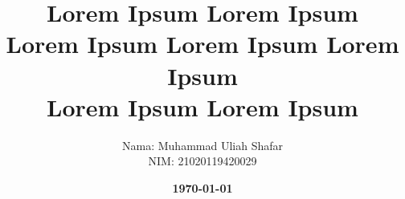 \documentclass[12pt, landscape]{simrep} %
\title{
	\textbf{Lorem Ipsum Lorem Ipsum \\
		Lorem Ipsum Lorem Ipsum Lorem Ipsum} \\
	\textbf{{Lorem Ipsum Lorem Ipsum \\}}
} %
\date{\textbf{\today}}
\author{
	\begin{tabular}{@{}ll@{}}
		Nama  &  : Muhammad Uliah Shafar  \\
		NIM   &  : 21020119420029  \\
	\end{tabular}
}
\begin{document}
\begin{comment}

\setlength\LTleft{0pt}
\setlength\LTright{0pt}
\begin{longtable}{*{8}{P{1.15in}}@{}}
	\toprule
	\logo                  & \multicolumn{5}{c}{ \large\thead{UNIVERSITAS MUHAMMADIYAH PAREPARE                                                                                                                                    \\  FAKULTAS TEKNIK\\ JURUSAN PERANCANGAN WILAYAH KOTA}} & \multicolumn{2}{c}{\kode} \\
    \bottomrule
	\multicolumn{8}{c}{\bfseries rencana pembelajaran semester}                                                                                                                                                                                            \\
    \midrule
    \multicolumn{2}{l}{\bfseries mata kuliah (MK)}       & \textbf{kode}                                                         & \textbf{rumpun mata kuliah}                 & \textbf{bobot (sks)}                             & \textbf{semester} & \multicolumn{2}{l}{\bfseries tanggal penyusunan} \\
    \midrule
	\multicolumn{2}{l}{\mk}                    & \kodemk                                                      & \rmk                               & \sks                                    & \smt     & \multicolumn{2}{l}{\datecreated}       \\
    \midrule
	\multicolumn{2}{l}{\bfseries otorisasi / pengesahan} & \multicolumn{2}{l}{\bfseries dosen pengembang rps}                     & \multicolumn{2}{l}{\bfseries Kordinator rmk} & \multicolumn{2}{l}{\bfseries ketua program studi}                                                     \\
    \midrule
	\multicolumn{2}{l}{}                       & \multicolumn{2}{l}{\dosenutama}                              & \multicolumn{2}{l}{\dosenkedua}    & \multicolumn{2}{l}{\dosenketiga}                                                            \\
    \midrule
    \multirow{5}{*}{\makecell{capaian\\ pembelajaran}}      & \multicolumn{3}{l}{CPL-PRODI yang dibebankan pada MK}        & \multicolumn{4}{l}{}                                                                                                             \\
    \cline{2-8}


\end{comment}
\end{document}
